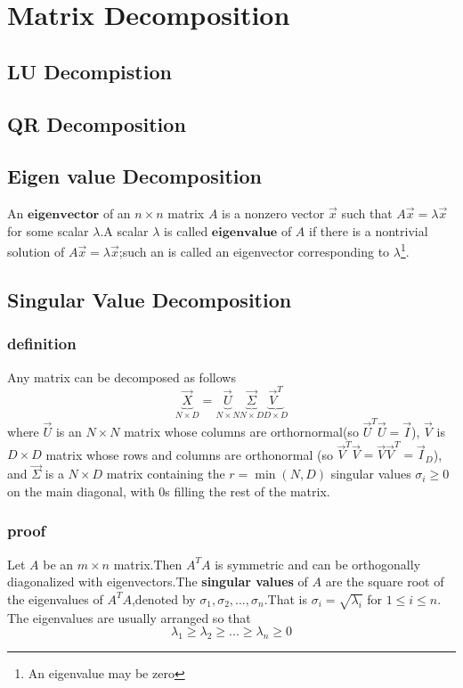 \chapter{Matrix Decomposition}
\label{chapter:Matrix Decomposition}
\section{LU Decompistion}
\section{QR Decomposition}
\section{Eigen value Decomposition}
\begin{definition}
	An $\mathbf{eigenvector}$ of an $n\times n$ matrix $A$ is a nonzero vector $\vec{x}$ such that $A\vec{x}=\lambda\vec{x}$ for some scalar $\lambda$.A scalar $\lambda$ is called $\mathbf{eigenvalue}$ of $A$ if there is a nontrivial solution  of $A\vec{x}=\lambda\vec{x}$;such an  is called an eigenvector corresponding to $\lambda$\footnote{An eigenvalue may be zero}.
\end{definition}


\section{Singular Value Decomposition}

\subsection{definition}
\begin{definition}
	Any matrix can be decomposed as follows
	\begin{equation}\label{eqn:SVD}
	\underbrace{\vec{X}}_{N \times D}=\underbrace{\vec{U}}_{N \times N}\underbrace{\vec{\Sigma}}_{N \times D}\underbrace{\vec{V}^T}_{D \times D}
	\end{equation}
	where $\vec{U}$ is an $N \times N$ matrix whose columns are orthornormal(so $\vec{U}^T\vec{U}=\vec{I}$), $\vec{V}$ is $D \times D$ matrix whose rows and columns are orthonormal (so $\vec{V}^T\vec{V}=\vec{V}\vec{V}^T=\vec{I}_D$), and $\vec{\Sigma}$ is a $N \times D$ matrix containing the $r=\min(N,D)$ singular values $\sigma_i \geq 0$ on the main diagonal, with 0s filling the rest of the matrix.
\end{definition}
\subsection{proof}
Let $A$ be an $m\times n$ matrix.Then $A^TA$ is symmetric and can be orthogonally diagonalized with eigenvectors.The \textbf{singular values} of $A$ are the square root of the eigenvalues of $A^TA$,denoted by $\sigma_1,\sigma_2,...,\sigma_n$.That is $\sigma_i = \sqrt{\lambda_i}$ for $1\leq i \leq n$.
The eigenvalues are usually arranged so that
\begin{equation}
\lambda_1 \geq \lambda_2 \geq...\geq \lambda_n \geq 0
\end{equation}

